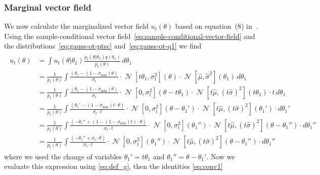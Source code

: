 \documentclass{article}
\theoremstyle{remark}
\DeclareMathOperator{\N}{\mathcal{N}}
\begin{document}
\subsubsection*{Marginal vector field}
We now calculate the marginalized vector field $u_t(\theta)$ based on equation~(8) in~\cite{flow_matching}. Using the sample-conditional vector field~\eqref{eq:sample-conditional-vector-field} and the distributions~\eqref{eq:gauss-ot-ptsc} and~\eqref{eq:gauss-ot-q1} we find 
\begin{align}
    \begin{split}
        u_t(\theta) 
        & = \int u_t(\theta|\theta_1)\frac{p_t(\theta|\theta_1)q(\theta_1)}{p_t(\theta)}\, d\theta_1\\
        & = \frac{1}{p_t(\theta)}\int 
        \frac{(\theta_1 - (1 - \sigma_\text{min})\theta)}{\sigma_t}\cdot
        \N\left[t\theta_1,\sigma_t^2\right](\theta)\cdot
        \N\left[\hat\mu,\hat\sigma^2\right](\theta_1)\,
        d\theta_1\\
        & =  \frac{1}{p_t(\theta)}\int 
        \frac{\left(\theta_1 - (1 - \sigma_\text{min})\theta\right)}{\sigma_t}\cdot
        \N\left[0,\sigma_t^2\right](\theta - t\theta_1)\cdot
        \N\left[t\hat\mu,(t\hat\sigma)^2\right](t\theta_1)\cdot t\,
        d\theta_1\\
        & = \frac{1}{p_t(\theta)}\int 
        \frac{\left(\theta_1' - (1 - \sigma_\text{min})t\cdot\theta\right)}
        {\sigma_t\cdot t}\cdot
        \N\left[0,\sigma_t^2\right](\theta - \theta_1')\cdot
        \N\left[t\hat\mu,(t\hat\sigma)^2\right](\theta_1')\cdot
        d\theta_1'\\
        & = \frac{1}{p_t(\theta)}\int 
        \frac{\left(-\theta_1'' + (1 - (1 - \sigma_\text{min})t)\cdot\theta\right)}
        {\sigma_t\cdot t}\cdot
        \N\left[0,\sigma_t^2\right](\theta_1'')\cdot
        \N\left[t\hat\mu,(t\hat\sigma)^2\right](\theta - \theta_1'')\cdot
        d\theta_1''\\
        & = \frac{1}{p_t(\theta)}\int 
        \frac{\left(-\theta_1'' + \sigma_t\cdot\theta\right)}
        {\sigma_t\cdot t}\cdot
        \N\left[0,\sigma_t^2\right](\theta_1'')\cdot
        \N\left[t\hat\mu,(t\hat\sigma)^2\right](\theta - \theta_1'')\cdot
        d\theta_1''
        \end{split}
        \end{align}
        where we used the change of variables 
        $ \theta_1'  = t\theta_1$
        and $
    \theta_1''  =   \theta-\theta_1'$.
        Now we evaluate this expression  using \eqref{eq:def_g}, then the identities \eqref{eq:conv1}
\end{document}
